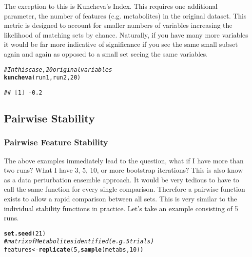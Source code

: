 \documentclass[12pt]{article}\usepackage[]{graphicx}\usepackage[usenames,dvipsnames]{color}
\makeatletter
\newcommand{\hlnum}[1]{\textcolor[rgb]{0.686,0.059,0.569}{#1}}%
\newcommand{\hlcom}[1]{\textcolor[rgb]{0.678,0.584,0.686}{\textit{#1}}}%
\newcommand{\hlstd}[1]{\textcolor[rgb]{0.345,0.345,0.345}{#1}}%
\newcommand{\hlkwb}[1]{\textcolor[rgb]{0.69,0.353,0.396}{#1}}%
\newcommand{\hlkwd}[1]{\textcolor[rgb]{0.737,0.353,0.396}{\textbf{#1}}}%
\newenvironment{kframe}{%
 \def\at@end@of@kframe{}%
 \ifinner\ifhmode%
  \def\at@end@of@kframe{\end{minipage}}%
  \begin{minipage}{\columnwidth}%
 \fi\fi%
 \def\FrameCommand##1{\hskip\@totalleftmargin \hskip-\fboxsep
 \colorbox{shadecolor}{##1}\hskip-\fboxsep
     \hskip-\linewidth \hskip-\@totalleftmargin \hskip\columnwidth}%
 \MakeFramed {\advance\hsize-\width
   \@totalleftmargin\z@ \linewidth\hsize
   \@setminipage}}%
 {\par\unskip\endMakeFramed%
 \at@end@of@kframe}
\newenvironment{knitrout}{}{} %
\makeatother
\begin{document}
The exception to this is Kuncheva's Index.  This requires one additional
parameter, the number of features (e.g. metabolites) in the original dataset.
This metric is designed to account for smaller numbers of variables increasing
the likelihood of matching sets by chance.  Naturally, if you have many more
variables it would be far more indicative of significance if you see the same
small subset again and again as opposed to a small set seeing the same 
variables.

\begin{knitrout}
\color{fgcolor}\begin{kframe}
\begin{alltt}
\hlcom{# In this case, 20 original variables}
\hlkwd{kuncheva}\hlstd{(run1, run2,} \hlnum{20}\hlstd{)}
\end{alltt}
\begin{verbatim}
## [1] -0.2
\end{verbatim}
\end{kframe}
\end{knitrout}

\newpage
\subsection{Pairwise Stability}
\subsubsection{Pairwise Feature Stability}

The above examples immediately lead to the question, what if I have more than
two runs?  What I have 3, 5, 10, or more bootstrap iterations?  This is also
know as a data perturbation ensemble approach.  It would be  very tedious to 
have to call the same function for every single comparison.  Therefore a 
pairwise function exists to allow a rapid comparison between all sets.  
This  is very similar to the individual 
stability functions in practice.  Let's take an example consisting of 5 runs.

\begin{knitrout}
\color{fgcolor}\begin{kframe}
\begin{alltt}
\hlkwd{set.seed}\hlstd{(}\hlnum{21}\hlstd{)}
\hlcom{# matrix of Metabolites identified (e.g. 5 trials)}
\hlstd{features} \hlkwb{<-} \hlkwd{replicate}\hlstd{(}\hlnum{5}\hlstd{,} \hlkwd{sample}\hlstd{(metabs,} \hlnum{10}\hlstd{))}
\end{alltt}
\end{kframe}
\end{knitrout}
\end{document}
